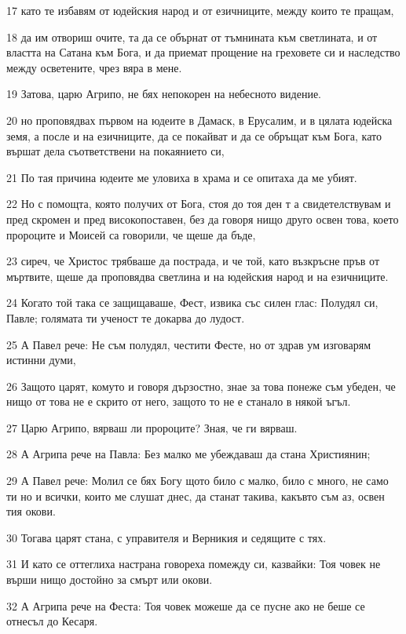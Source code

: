 \par 17 като те избавям от юдейския народ и от езичниците, между които те пращам,
\par 18 да им отвориш очите, та да се обърнат от тъмнината към светлината, и от властта на Сатана към Бога, и да приемат прощение на греховете си и наследство между осветените, чрез вяра в мене.
\par 19 Затова, царю Агрипо, не бях непокорен на небесното видение.
\par 20 но проповядвах първом на юдеите в Дамаск, в Ерусалим, и в цялата юдейска земя, а после и на езичниците, да се покайват и да се обръщат към Бога, като вършат дела съответствени на покаянието си,
\par 21 По тая причина юдеите ме уловиха в храма и се опитаха да ме убият.
\par 22 Но с помощта, която получих от Бога, стоя до тоя ден т а свидетелствувам и пред скромен и пред високопоставен, без да говоря нищо друго освен това, което пророците и Моисей са говорили, че щеше да бъде,
\par 23 сиреч, че Христос трябваше да пострада, и че той, като възкръсне пръв от мъртвите, щеше да проповядва светлина и на юдейския народ и на езичниците.
\par 24 Когато той така се защищаваше, Фест, извика със силен глас: Полудял си, Павле; голямата ти ученост те докарва до лудост.
\par 25 А Павел рече: Не съм полудял, честити Фесте, но от здрав ум изговарям истинни думи,
\par 26 Защото царят, комуто и говоря дързостно, знае за това понеже съм убеден, че нищо от това не е скрито от него, защото то не е станало в някой ъгъл.
\par 27 Царю Агрипо, вярваш ли пророците? Зная, че ги вярваш.
\par 28 А Агрипа рече на Павла: Без малко ме убеждаваш да стана Християнин;
\par 29 А Павел рече: Молил се бях Богу щото било с малко, било с много, не само ти но и всички, които ме слушат днес, да станат такива, какъвто съм аз, освен тия окови.
\par 30 Тогава царят стана, с управителя и Верникия и седящите с тях.
\par 31 И като се оттеглиха настрана говореха помежду си, казвайки: Тоя човек не върши нищо достойно за смърт или окови.
\par 32 А Агрипа рече на Феста: Тоя човек можеше да се пусне ако не беше се отнесъл до Кесаря.

